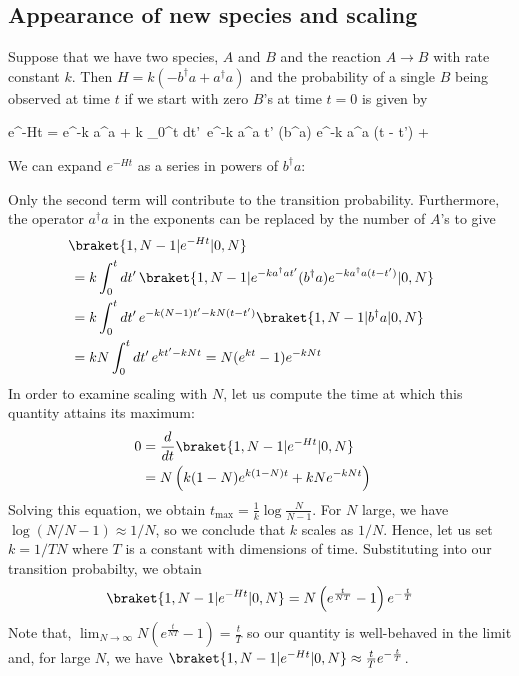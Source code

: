 {\subsection{Appearance of new species and scaling}





Suppose that we have two species, $A$ and $B$ and the reaction $A \to B$ with rate constant $k$.  Then $H = k (-b^\dagger a + a^\dagger a)$ and the probability of a single $B$ being observed at time $t$ if we start with zero $B$'s at time $t=0$ is given by



 e^{-Ht} = e^{-k a^\dagger a} +
   k \int_0^t dt'\, e^{-k a^\dagger a t'} (b^\dagger a) e^{-k a^\dagger a (t - t')}
   + \cdots


We can expand $e^{-Ht}$ as a series in powers of $b^\dagger a$:


Only the second term will contribute to the transition probability.  Furthermore, the operator $a^\dagger a$ in the exponents can be replaced by the number of $A$'s to give
\begin{align*}
 &\!\braket{1, N-1 | e^{-Ht} | 0, N} \cr &=
 k \int_0^t dt'\,\braket{1, N-1 | e^{-k a^\dagger a t'} (b^\dagger a) e^{-k a^\dagger a (t - t')} | 0, N} \cr &=
 k \int_0^t dt'\, e^{-k (N-1) t' - k N (t - t')} \braket{1, N-1 | b^\dagger a | 0, N} \cr &=
 kN \int_0^t dt'\, e^{kt' - kNt} = N (e^{kt} - 1) e^{-kNt}
\end{align*}
In order to examine scaling with $N$, let us compute the time at which this quantity attains its maximum:
\begin{align*}
 0 &= \frac{d}{dt} \braket{1, N-1 | e^{-Ht} | 0, N} \cr &=
 N \left( k (1-N) e^{k (1-N) t} + kN e^{-kNt} \right)
 \end{align*}
Solving this equation, we obtain $t_\mathrm{max} = \frac{1}{k} \log \frac{N}{N-1}$.  For $N$ large, we have $\log(N/N-1) \approx 1/N$, so we conclude that $k$ scales as $1/N$.  Hence, let us set $k = 1/TN$ where $T$ is a constant with dimensions of time.  Substituting into our transition probabilty, we obtain
\begin{align*}
 \braket{1, N-1 | e^{-Ht} | 0, N} =
 N \left( e^\frac{t}{NT} - 1 \right) e^{-\frac{t}{T}}
 \end{align*}
Note that, $\lim_{N \to \infty} N \left( e^\frac{t}{NT} - 1 \right) = \frac{t}{T}$  so our quantity is well-behaved in the limit and, for large $N$, we have $\braket{1, N-1 | e^{-Ht} | 0, N} \approx \frac{t}{T} e^{-\frac{t}{T}}$.



}
